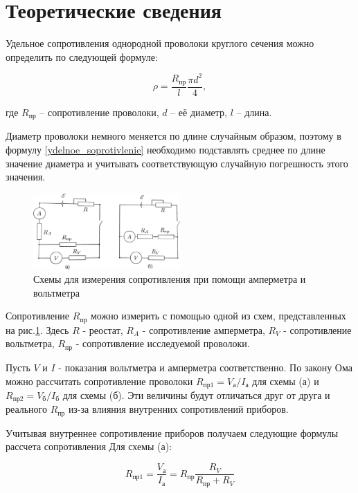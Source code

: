 \documentclass[a4paper,12pt]{article}
\begin{document}
\section{Теоретические сведения}

Удельное сопротивления однородной проволоки круглого сечения можно определить по следующей формуле:

\begin{equation}\label{ydelnoe_soprotivlenie}
\rho = \frac{R_{\text{пр}}}{l}\frac{\pi d^2}{4},
\end{equation}

\noindent где $R_{\text{пр}}$ -- сопротивление проволоки, $d$ -- её диаметр, $l$ -- длина.


Диаметр проволоки немного меняется по длине случайным образом, поэтому в формулу \eqref{ydelnoe_soprotivlenie} необходимо подставлять среднее по длине значение диаметра и учитывать соответствующую случайную погрешность этого значения.


\begin{figure}
\includegraphics[width=0.5\textwidth]{schemi}
\caption{Схемы для измерения сопротивления при помощи амперметра и вольтметра} \label{schemi}
\end{figure}
Сопротивление $R_{\text{пр}}$ можно измерить с помощью одной из схем, представленных на рис.\ref{schemi}. Здесь $R$ - реостат, $R_A$ - сопротивление амперметра, $R_V$ - сопротивление вольтметра, $R_{\text{пр}}$ - сопротивление исследуемой проволоки.


Пусть $V$ и $I$ - показания вольтметра и амперметра соответственно. По закону Ома можно рассчитать сопротивление проволоки $R_{\text{пр1}} = V_{\text{а}}/I_{\text{а}}$ для схемы (а) и $R_{\text{пр2}} = V_{\text{б}}/I_{\text{б}}$ для схемы (б). Эти величины будут отличаться друг от друга и реального $R_{\text{пр}}$ из-за влияния внутренних сопротивлений приборов.


Учитывая внутреннее сопротивление приборов получаем следующие формулы рассчета сопротивления
Для схемы (а):

\[ R_{\text{пр1}} =\dfrac{V_{\text{а}}}{I_{\text{а}}} = R_{\text{пр}}\dfrac{R_V}{R_{\text{пр}} + R_V} \]
\end{document}
